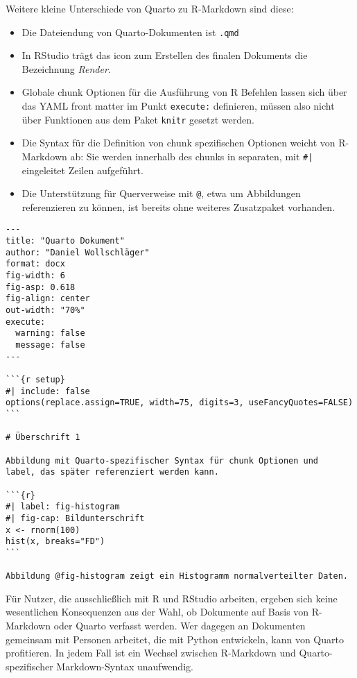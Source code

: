 Weitere kleine Unterschiede von Quarto zu R-Markdown sind diese:
\begin{itemize}
\item Die Dateiendung von Quarto-Dokumenten ist \texttt{.qmd}
\item In RStudio trägt das icon zum Erstellen des finalen Dokuments die Bezeichnung \emph{Render}.
\item Globale chunk Optionen für die Ausführung von R Befehlen lassen sich über das YAML front matter im Punkt \lstinline!execute:! definieren, müssen also nicht über Funktionen aus dem Paket \lstinline!knitr! gesetzt werden.
\item Die Syntax für die Definition von chunk spezifischen Optionen weicht von R-Markdown ab: Sie werden innerhalb des chunks in separaten, mit \lstinline!#|! eingeleitet Zeilen aufgeführt.
\item Die Unterstützung für Querverweise mit \lstinline!@!, etwa um Abbildungen referenzieren zu können, ist bereits ohne weiteres Zusatzpaket vorhanden.
\end{itemize}

\begin{lstlisting}
---
title: "Quarto Dokument"
author: "Daniel Wollschläger"
format: docx
fig-width: 6
fig-asp: 0.618
fig-align: center
out-width: "70%"
execute:
  warning: false
  message: false
---

```{r setup}
#| include: false
options(replace.assign=TRUE, width=75, digits=3, useFancyQuotes=FALSE)
```
 
# Überschrift 1

Abbildung mit Quarto-spezifischer Syntax für chunk Optionen und
label, das später referenziert werden kann.

```{r}
#| label: fig-histogram
#| fig-cap: Bildunterschrift
x <- rnorm(100)
hist(x, breaks="FD")
```

Abbildung @fig-histogram zeigt ein Histogramm normalverteilter Daten.
\end{lstlisting}

Für Nutzer, die ausschließlich mit R und RStudio arbeiten, ergeben sich keine wesentlichen Konsequenzen aus der Wahl, ob Dokumente auf Basis von R-Markdown oder Quarto verfasst werden. Wer dagegen an Dokumenten gemeinsam mit Personen arbeitet, die mit Python entwickeln, kann von Quarto profitieren. In jedem Fall ist ein Wechsel zwischen R-Markdown und Quarto-spezifischer Markdown-Syntax unaufwendig.

